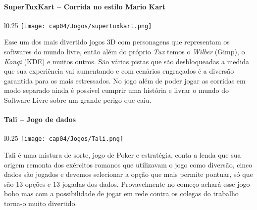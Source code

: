 \paragraph{SuperTuxKart – Corrida no estilo Mario Kart}
\begin{minipage}{\linewidth}
 \vspace{5pt}
 \begin{wrapfigure}{l}{0.25\textwidth}
  \vspace{-\baselineskip}
  \texttt{[image: cap04/Jogos/supertuxkart.png]} 
 \end{wrapfigure}
 Esse um dos mais divertido jogos 3D com personagens que representam os softwares do mundo livre, então além do próprio \textit{Tux} temos o \textit{Wilber} (Gimp), o \textit{Konqi} (KDE) e muitos outros. São várias pistas que são desbloqueadas a medida que sua experiência vai aumentando e com cenários engraçados é a diversão garantida para os mais estressados. No jogo além de poder jogar as corridas em modo separado ainda é possível cumprir uma história e livrar o mundo do Software Livre sobre um grande perigo que caiu.
\end{minipage}

\paragraph{Tali – Jogo de dados}
\begin{minipage}{\linewidth}
 \vspace{5pt}
 \begin{wrapfigure}{l}{0.25\textwidth}
  \vspace{-\baselineskip}
  \texttt{[image: cap04/Jogos/Tali.png]} 
 \end{wrapfigure}
 Tali é uma mistura de sorte, jogo de Poker e estratégia, conta a lenda que sua origem remonta dos exércitos romanos que utilizavam o jogo como diversão, cinco dados são jogados e devemos selecionar a opção que mais permite pontuar, só que são 13 opções e 13 jogadas dos dados. Provavelmente no começo achará esse jogo bobo mas com a possibilidade de jogar em rede contra os colegas do trabalho torna-o muito divertido.
\end{minipage}

